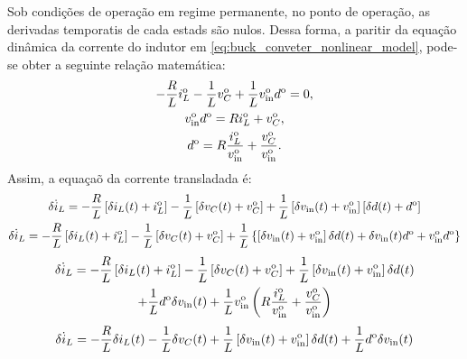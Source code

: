 Sob condições de operação em regime permanente, no ponto de operação, as derivadas temporatis de cada estads são nulos. Dessa forma, a paritir da equação dinâmica da corrente do indutor em \eqref{eq:buck_conveter_nonlinear_model}, pode-se obter a seguinte relação matemática:
\begin{gather}
  - \frac{R} L i_L^{\rm o} - \frac{1}{L} v_C^{\rm o} + \frac{1}{L} v_{\rm{in}}^{\rm o} d^{\rm o} = 0, \\
  v_{\rm{in}}^{\rm o} d^{\rm o} = R i_L^{\rm o} + v_C^{\rm o}, \\
  d^{\rm o} = R \frac{i_L^{\rm o}}{v_{\rm{in}}^{\rm o}} + \frac{v_C^{\rm o}}{v_{\rm{in}}^{\rm o}}.
\end{gather}
Assim, a equaçaõ da corrente transladada é:
\begin{gather}
  \delta \dot i_L = - \frac{R} L \left[\delta i_L(t) + i_L^{\rm o}\right]
  - \frac{1}{L} \left[\delta v_C(t) + v_C^{\rm o}\right]
  + \frac{1}{L} \left[\delta v_{\rm{in}}(t) + v_{\rm{in}}^{\rm o}\right] \left[\delta d(t) + d^{\rm o}\right] \\
  \delta \dot i_L = - \frac{R} L \left[\delta i_L(t) + i_L^{\rm o}\right]
  - \frac{1}{L} \left[\delta v_C(t) + v_C^{\rm o}\right]
  + \frac{1}{L} \left\{\left[\delta v_{\rm{in}}(t) + v_{\rm{in}}^{\rm o}\right] \delta d(t)
  + \delta v_{\rm in}(t)d^{\rm o} + v_{\rm in}^{\rm o} d^{\rm o}\right\}
\end{gather}
\vspace*{-48pt}
\begin{multline}
  \delta \dot i_L = - \frac{R} L \left[\delta i_L(t) + i_L^{\rm o}\right]
  - \frac{1}{L} \left[\delta v_C(t) + v_C^{\rm o}\right]
  + \frac{1}{L} \left[\delta v_{\rm{in}}(t) + v_{\rm{in}}^{\rm o}\right] \delta d(t) \\
  + \frac{1}{L} d^{\rm o} \delta v_{\rm in}(t) + \frac{1}{L} v_{\rm in}^{\rm o}
  \left(R \frac{i_L^{\rm o}}{v_{\rm{in}}^{\rm o}} + \frac{v_C^{\rm o}}{v_{\rm{in}}^{\rm o}}\right)
\end{multline}
\vspace*{-40pt}
\begin{gather}
  \delta \dot i_L = - \frac{R}{L} \delta i_L(t) - \frac{1}{L} \delta v_C(t)
  + \frac{1}{L} \left[\delta v_{\rm{in}}(t) + v_{\rm{in}}^{\rm o}\right] \delta d(t)
  + \frac{1}{L} d^{\rm o} \delta v_{\rm in}(t)
\end{gather}

